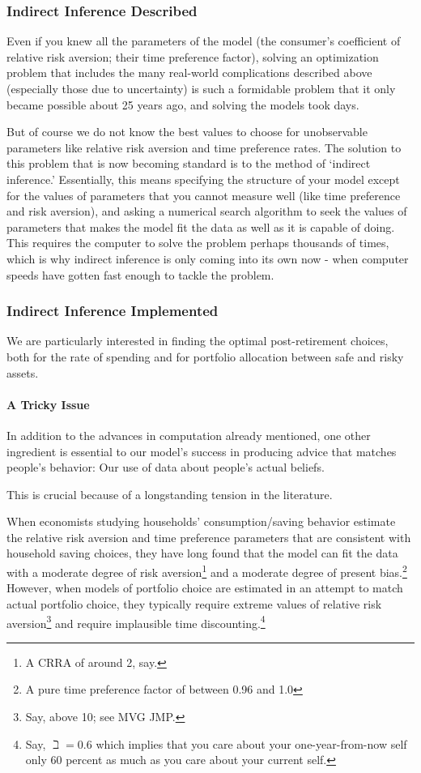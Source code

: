 \documentclass{article}
\begin{document}
\subsubsection{Indirect Inference Described}

Even if you knew all the parameters of the model (the consumer's coefficient of relative risk aversion; their time preference factor), solving an optimization problem that includes the many real-world complications described above (especially those due to uncertainty) is such a formidable problem that it only became possible about 25 years ago, and solving the models took days.

But of course we do not know the best values to choose for unobservable parameters like relative risk aversion and time preference rates. The solution to this problem that is now becoming standard is to the method of `indirect inference.' Essentially, this means specifying the structure of your model except for the values of parameters that you cannot measure well (like time preference and risk aversion), and asking a numerical search algorithm to seek the values of parameters that makes the model fit the data as well as it is capable of doing. This requires the computer to solve the problem perhaps thousands of times, which is why indirect inference is only coming into its own now - when computer speeds have gotten fast enough to tackle the problem.

\subsubsection{Indirect Inference Implemented}

We are particularly interested in finding the optimal post-retirement choices, both for the rate of spending and for portfolio allocation between safe and risky assets.

\paragraph{A Tricky Issue}

In addition to the advances in computation already mentioned, one other ingredient is essential to our model's success in producing advice that matches people's behavior: Our use of data about people's actual beliefs.

This is crucial because of a longstanding tension in the literature.

When economists studying households' consumption/saving behavior estimate the relative risk aversion and time preference parameters that are consistent with household saving choices, they have long found that the model can fit the data with a moderate degree of risk aversion\footnote{A CRRA of around 2, say.} and a moderate degree of present bias.\footnote{A pure time preference factor of between 0.96 and 1.0} However, when models of portfolio choice are estimated in an attempt to match actual portfolio choice, they typically require extreme values of relative risk aversion\footnote{Say, above 10; see MVG JMP.} and require implausible time discounting.\footnote{Say, $\beth = 0.6$ which implies that you care about your one-year-from-now self only 60 percent as much as you care about your current self.}
\end{document}
